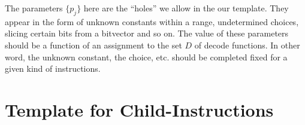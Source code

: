 \documentclass[letterpaper, 11 pt]{article}
\begin{document}
%

The parameters $\{ p_j \}$ here are the ``holes'' we allow in the our template. They appear in the form of unknown constants within a range, undetermined choices, slicing certain bits from a bitvector and so on. The value of these parameters should be a function of an assignment to the set $D$ of decode functions. In other word, the unknown constant, the choice, etc. should be completed fixed for a given kind of instructions.

\section{Template for Child-Instructions}



%
%
\end{document}
